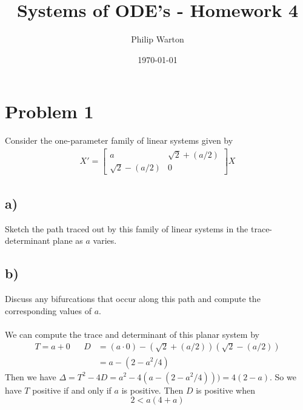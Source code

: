 \documentclass{article}
\theoremstyle{definition}
\begin{document}
\title{Systems of ODE's - Homework 4}
\author{Philip Warton}
\date{\today}
\maketitle
\section*{Problem 1}
    Consider the one-parameter family of linear systems given by
    \begin{align}
        X'=\begin{bmatrix}
            a&\sqrt{2}+(a/2)\\\sqrt{2}-(a/2)&0
        \end{bmatrix}X
    \end{align}
    \subsection*{a)}
        Sketch the path traced out by this family of linear systems in the
        trace-determinant plane as $a$ varies.
    \subsection*{b)}
        Discuss any bifurcations that occur along this path and compute the 
        corresponding values of $a$.\\\\
        We can compute the trace and determinant of this planar system by 
        \begin{align}
            T = a + 0 & & D &= (a \cdot 0) - (\sqrt{2} + (a/2))(\sqrt{2} - (a/2)) \\
            &&&= a - (2 - a^2 / 4)
        \end{align}
        Then we have $\Delta = T^2 - 4D = a^2 - 4(a - (2 - a^2/4))) = 4(2-a)$.
        So we have $T$ positive if and only if $a$ is positive. Then $D$ is positive when 
        \[
            2 < a(4 + a)
        \]
\end{document}
